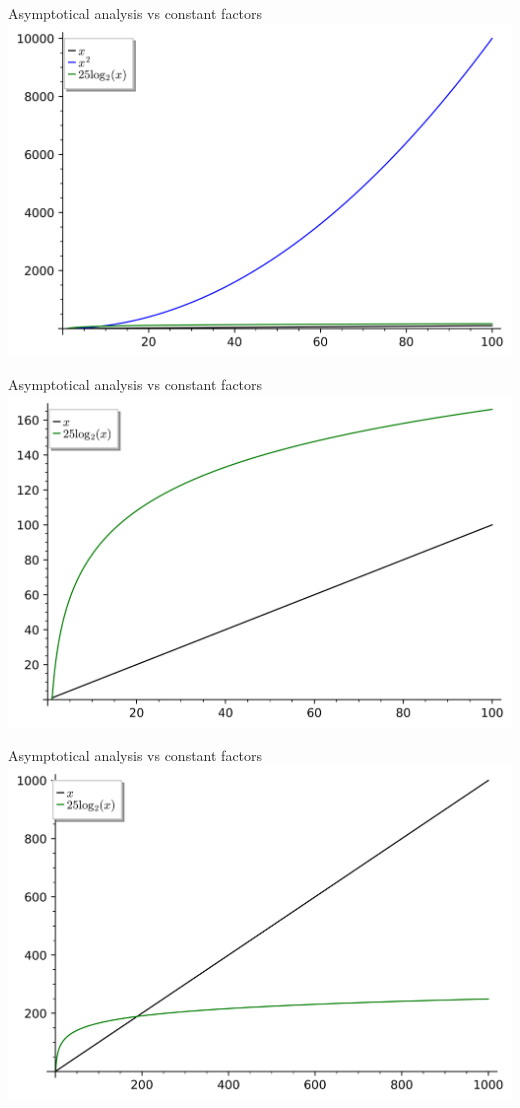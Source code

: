 \documentclass[11pt]{beamer}
\begin{document}
\begin{frame}{Asymptotical analysis vs constant factors}
	\includegraphics[scale=0.7]{img/plot3.png}
\end{frame}

\begin{frame}{Asymptotical analysis vs constant factors}
	\includegraphics[scale=0.7]{img/plot4.png}
\end{frame}

\begin{frame}{Asymptotical analysis vs constant factors}
	\includegraphics[scale=0.7]{img/plot5.png}
\end{frame}
\end{document}
